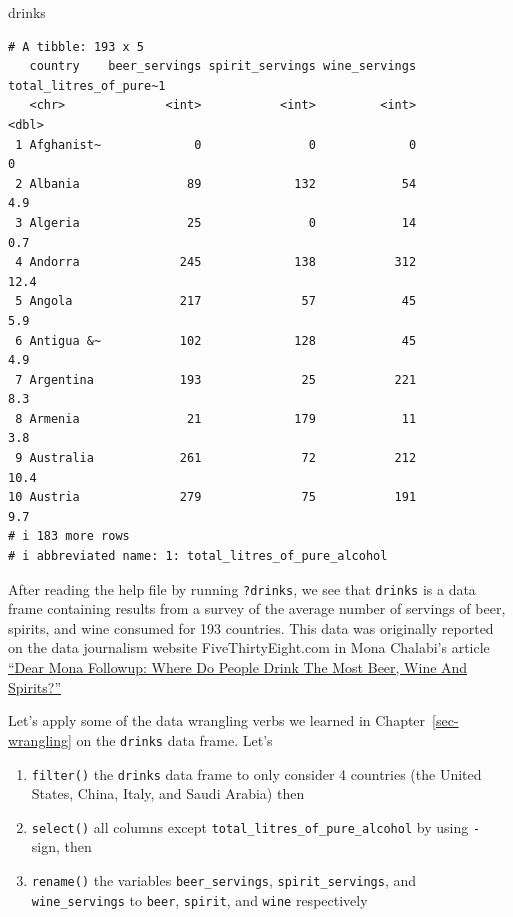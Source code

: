 \documentclass[
  letterpaper,
  DIV=11,
  numbers=noendperiod]{scrreprt}
\newenvironment{Shaded}{\begin{snugshade}}{\end{snugshade}}
\newcommand{\NormalTok}[1]{\textcolor[rgb]{0.00,0.23,0.31}{#1}}
\theoremstyle{definition}
\theoremstyle{remark}
\begin{document}
\begin{Shaded}
\begin{Highlighting}[]
\NormalTok{drinks}
\end{Highlighting}
\end{Shaded}

\begin{verbatim}
# A tibble: 193 x 5
   country    beer_servings spirit_servings wine_servings total_litres_of_pure~1
   <chr>              <int>           <int>         <int>                  <dbl>
 1 Afghanist~             0               0             0                    0  
 2 Albania               89             132            54                    4.9
 3 Algeria               25               0            14                    0.7
 4 Andorra              245             138           312                   12.4
 5 Angola               217              57            45                    5.9
 6 Antigua &~           102             128            45                    4.9
 7 Argentina            193              25           221                    8.3
 8 Armenia               21             179            11                    3.8
 9 Australia            261              72           212                   10.4
10 Austria              279              75           191                    9.7
# i 183 more rows
# i abbreviated name: 1: total_litres_of_pure_alcohol
\end{verbatim}

After reading the help file by running \texttt{?drinks}, we see that
\texttt{drinks} is a data frame containing results from a survey of the
average number of servings of beer, spirits, and wine consumed for 193
countries. This data was originally reported on the data journalism
website FiveThirtyEight.com in Mona Chalabi's article
\href{https://fivethirtyeight.com/features/dear-mona-followup-where-do-people-drink-the-most-beer-wine-and-spirits/}{``Dear
Mona Followup: Where Do People Drink The Most Beer, Wine And Spirits?''}

Let's apply some of the data wrangling verbs we learned in
Chapter~\ref{sec-wrangling} on the \texttt{drinks} data frame. Let's

\begin{enumerate}
\def\labelenumi{\arabic{enumi}.}
\item
  \texttt{filter()} the \texttt{drinks} data frame to only consider 4
  countries (the United States, China, Italy, and Saudi Arabia) then
\item
  \texttt{select()} all columns except
  \texttt{total\_litres\_of\_pure\_alcohol} by using \texttt{-} sign,
  then
\item
  \texttt{rename()} the variables \texttt{beer\_servings},
  \texttt{spirit\_servings}, and \texttt{wine\_servings} to
  \texttt{beer}, \texttt{spirit}, and \texttt{wine} respectively
\end{enumerate}
\end{document}
